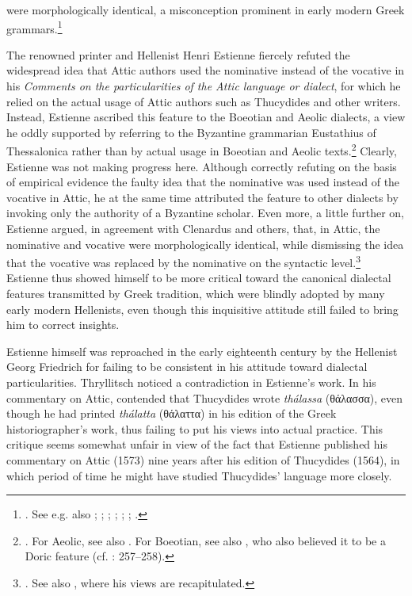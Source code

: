 were morphologically identical, a misconception prominent in early modern Greek grammars.\footnote{\citet[7 (misprint for 6)]{Clenardus1530}. See e.g. also \citet[534]{Crusius1558}; \citet[12\textsc{\textsuperscript{r}}]{Baile1588}; \citet[11, 37]{Walper1589}; \citet[32, 34]{Gretser1593}; \citet[53, 453]{Lancelot1655}; \citet[101]{Giraudeau1739}; \citet[20]{Facius1782}.}

The renowned printer and Hellenist Henri Estienne fiercely refuted the widespread idea that Attic authors used the nominative instead of the vocative in his \textit{Comments on the particularities of the Attic language or dialect}, for which he relied on the actual usage of Attic authors such as Thucydides and other writers. Instead, Estienne ascribed this feature to the Boeotian and Aeolic dialects, a view he oddly supported by referring to the Byzantine grammarian Eustathius of Thessalonica rather than by actual usage in Boeotian and Aeolic texts.\footnote{\citet[15]{Estienne1573}. For Aeolic, see also \citet[(.4\textsc{\textsuperscript{v}}]{Schmidt1604}. For Boeotian, see also \citet[71]{Merigon1621}, who also believed it to be a Doric feature (cf. \citealt{Maittaire1706}: 257–258).} Clearly, Estienne was not making progress here. Although correctly refuting on the basis of empirical evidence the faulty idea that the nominative was used instead of the vocative in Attic, he at the same time attributed the feature to other dialects by invoking only the authority of a Byzantine scholar. Even more, a little further on, Estienne argued, in agreement with Clenardus and others, that, in Attic, the nominative and vocative were morphologically identical, while dismissing the idea that the vocative was replaced by the nominative on the syntactic level.\footnote{\citet[17]{Estienne1573}. See also \citet[29, 42–43, 150]{Estienne1573}, where his views are recapitulated.} Estienne thus showed himself to be more critical toward the canonical dialectal features transmitted by Greek tradition, which were blindly adopted by many early modern Hellenists, even though this inquisitive attitude still failed to bring him to correct insights.

Estienne himself was reproached in the early eighteenth century by the Hellenist Georg Friedrich \citet[d.3\textsuperscript{v}]{Thryllitsch1709} for failing to be consistent in his attitude toward dialectal particularities. Thryllitsch noticed a contradiction in Estienne’s work. In his commentary on Attic, \citet[13]{Estienne1573} contended that Thucydides wrote \textit{thálassa} (θάλασσα), even though he had printed \textit{thálatta} (θάλαττα) in his edition of the Greek historiographer’s work, thus failing to put his views into actual practice. This critique seems somewhat unfair in view of the fact that Estienne published his commentary on Attic (1573) nine years after his edition of Thucydides (1564), in which period of time he might have studied Thucydides’ language more closely.

